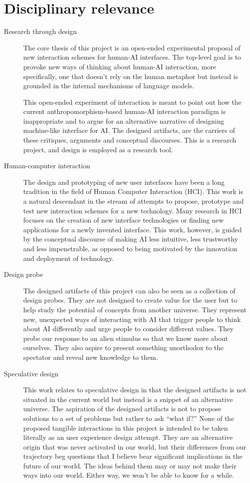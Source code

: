\documentclass[12pt]{article}
\begin{document}
\section{Disciplinary relevance}
\begin{description}
    \item[Research through design] The core thesis of this project is an open-ended experimental proposal of new interaction schemes for human-AI interfaces. The top-level goal is to provoke new ways of thinking about human-AI interaction, more specifically, one that doesn't rely on the human metaphor but instead is grounded in the internal mechanisms of language models.
    
    This open-ended experiment of interaction is meant to point out how the current anthropomorphism-based human-AI interaction paradigm is inappropriate and to argue for an alternative narrative of designing machine-like interface for AI. The designed artifacts, are the carriers of these critiques, arguments and conceptual discourses. This is a research project, and design is employed as a research tool.
    \item[Human-computer interaction] The design and prototyping of new user interfaces have been a long tradition in the field of Human Computer Interaction (HCI). This work is a natural descendant in the stream of attempts to propose, prototype and test new interaction schemes for a new technology. Many research in HCI focuses on the creation of new interface technologies or finding new applications for a newly invented interface. This work, however, is guided by the conceptual discourse of making AI less intuitive, less trustworthy and less impenetrable, as opposed to being motivated by the innovation and deployment of technology.
    \item[Design probe] The designed artifacts of this project can also be seen as a collection of design probes. They are not designed to create value for the user but to help study the potential of concepts from another universe. They represent new, unexpected ways of interacting with AI that trigger people to think about AI differently and urge people to consider different values. They probe our response to an alien stimulus so that we know more about ourselves. They also aspire to present something unorthodox to the spectator and reveal new knowledge to them.
    \item[Speculative design] This work relates to speculative design in that the designed artifacts is not situated in the current world but instead is a snippet of an alternative universe. The aspiration of the designed artifacts is not to propose solutions to a set of problems but rather to ask ``what if?'' None of the proposed tangible interactions in this project is intended to be taken literally as an user experience design attempt. They are an alternative origin that was never activated in our world, but their differences from our trajectory beg questions that I believe bear significant implications in the future of our world. The ideas behind them may or may not make their ways into our world. Either way, we won't be able to know for a while.
    

\end{description}
\end{document}

